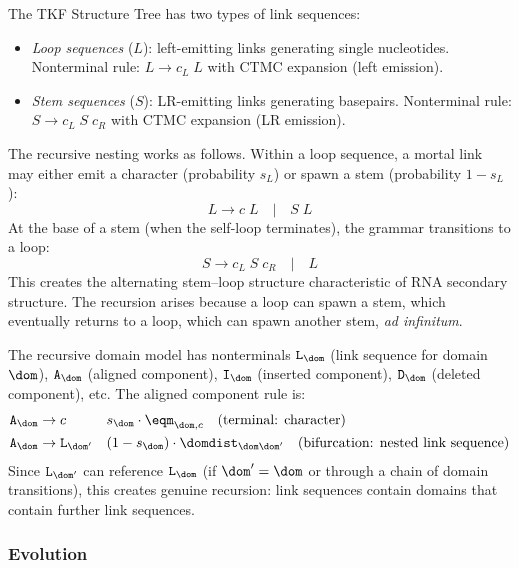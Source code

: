 \begin{example}
\label{ex:structure-tree-appendix}
The TKF Structure Tree has two types of link sequences:
\begin{itemize}
\item \emph{Loop sequences} ($L$): left-emitting links generating
  single nucleotides. Nonterminal rule:
  $L \to c_L\;L$ with CTMC expansion (left emission).
\item \emph{Stem sequences} ($S$): LR-emitting links generating
  basepairs. Nonterminal rule:
  $S \to c_L\;S\;c_R$ with CTMC expansion (LR emission).
\end{itemize}
The recursive nesting works as follows.
Within a loop sequence, a mortal link may either emit a character
(probability $s_L$) or spawn a stem (probability $1-s_L$):
\[
L \to c\;L \quad |\quad S\;L
\]
At the base of a stem (when the self-loop terminates),
the grammar transitions to a loop:
\[
S \to c_L\;S\;c_R \quad |\quad L
\]
This creates the alternating stem--loop structure
characteristic of RNA secondary structure.
The recursion arises because a loop can spawn a stem,
which eventually returns to a loop, which can spawn another stem,
\emph{ad infinitum}.
\end{example}

\begin{example}
The recursive domain model has nonterminals $\texttt{L}_\dom$
(link sequence for domain $\dom$),
$\texttt{A}_\dom$ (aligned component),
$\texttt{I}_\dom$ (inserted component),
$\texttt{D}_\dom$ (deleted component), etc.
The aligned component rule is:
\begin{align*}
\texttt{A}_\dom &\to c && s_\dom \cdot \eqm_{\dom,c}
  \quad\text{(terminal: character)} \\
\texttt{A}_\dom &\to \texttt{L}_{\dom'} && (1-s_\dom) \cdot \domdist_{\dom\dom'}
  \quad\text{(bifurcation: nested link sequence)}
\end{align*}
Since $\texttt{L}_{\dom'}$ can reference $\texttt{L}_\dom$
(if $\dom' = \dom$ or through a chain of domain transitions),
this creates genuine recursion: link sequences contain domains
that contain further link sequences.
\end{example}

\subsubsection{Evolution}
\label{sec:evolution-appendix}

